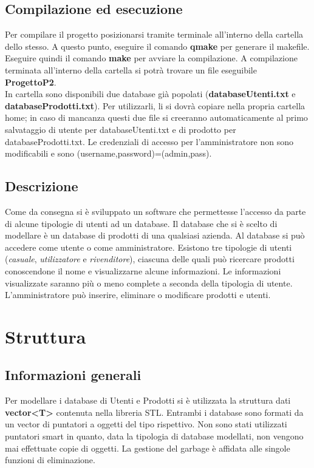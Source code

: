 \documentclass[a4paper,10pt] {article}
\begin{document}
\subsection{Compilazione ed esecuzione}
Per compilare il progetto posizionarsi tramite terminale all'interno della cartella dello stesso. A questo punto, eseguire il comando \textbf{qmake} per generare
il makefile. Eseguire quindi il comando \textbf{make} per avviare la compilazione. A compilazione terminata all'interno della cartella si potrà trovare un file 
eseguibile \textbf{ProgettoP2}.\\
In cartella sono disponibili due database già popolati (\textbf{databaseUtenti.txt} e \textbf{databaseProdotti.txt}). Per utilizzarli, li si dovrà copiare nella
propria cartella home; in caso di mancanza questi due file si creeranno automaticamente al primo salvataggio di utente per databaseUtenti.txt e di prodotto per
databaseProdotti.txt.
Le credenziali di accesso per l'amministratore non sono modificabili e sono (username,password)=(admin,pass).

\subsection{Descrizione}
Come da consegna si è sviluppato un software che permettesse l'accesso da parte di alcune tipologie di utenti ad un database. Il database che si è scelto di 
modellare è un database di prodotti di una qualsiasi azienda. Al database si può accedere come utente o come amministratore. Esistono tre tipologie di utenti (\textsl{casuale}, \textsl{utilizzatore} e \textsl{rivenditore}),
ciascuna delle quali può
ricercare prodotti conoscendone il nome e visualizzarne alcune informazioni. Le informazioni visualizzate saranno più o meno complete a seconda della tipologia
di utente. L'amministratore può inserire, eliminare o modificare prodotti e utenti.

\newpage

\section{Struttura}

\subsection{Informazioni generali}
Per modellare i database di Utenti e Prodotti si è utilizzata la struttura dati \textbf{vector<T>} contenuta nella libreria STL. Entrambi i database sono formati
da un vector di puntatori a oggetti del tipo rispettivo. Non sono stati utilizzati puntatori smart in quanto, data la tipologia di database modellati, non vengono
mai effettuate copie di oggetti. La gestione del garbage è affidata alle singole funzioni di eliminazione.
\end{document}
